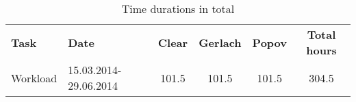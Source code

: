 \begin{table}[H]

\begin{threeparttable}

  \caption{Time durations in total}
  
  \begin{tabular}{p{3cm} p{1.7cm}|c c c| c}
      \textbf{Task} & \textbf{Date}& \textbf{Clear} & \textbf{Gerlach} & \textbf{Popov} & \textbf{Total hours} \\
    
    Workload            & 15.03.2014-29.06.2014    & 101.5 & 101.5 & 101.5 & 304.5 \\
    
\end{tabular}

\end{threeparttable}


\end{table}

